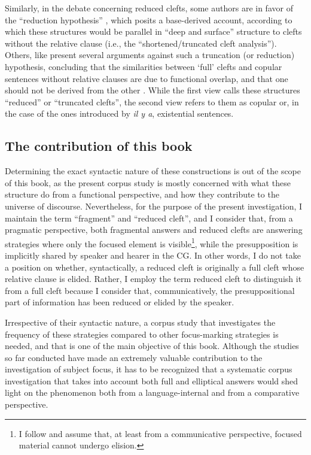 Similarly, in the debate concerning reduced clefts, some authors are in favor of the “reduction hypothesis” \parencite{jenkins2017cleft}, which posits a base-derived account, according to which these structures would be parallel in “deep and surface” structure to clefts without the relative clause (i.e., the ``shortened/truncated cleft analysis”). Others, like \textcite{milsark2014existential, birner2007functional} present several arguments against such a truncation (or reduction) hypothesis, concluding that the similarities between ‘full’ clefts and copular sentences without relative clauses are due to functional overlap, and that one should not be derived from the other \parencite[319]{birner2007functional}. While the first view calls these structures ``reduced” or ``truncated clefts”, the second view refers to them as copular or, in the case of the ones introduced by \textit{il y a}, existential sentences.

\subsection{The contribution of this book}
Determining the exact syntactic nature of these constructions is out of the scope of this book, as the present corpus study is mostly concerned with what these structure do from a functional perspective, and how they contribute to the universe of discourse. Nevertheless, for the purpose of the present investigation, I maintain the term ``fragment” and ``reduced cleft”, and I consider that, from a pragmatic perspective, both fragmental answers and reduced clefts are answering strategies where only the focused element is visible\footnote{I follow \textcite{yoshida2013predictive} and assume that, at least from a communicative perspective, focused material cannot undergo elision.
}, while the presupposition is implicitly shared by speaker and hearer in the CG. In other words, I do not take a position on whether, syntactically, a reduced cleft is originally a full cleft whose relative clause is elided. Rather, I employ the term reduced cleft to distinguish it from a full cleft because I consider that, communicatively, the presuppositional part of information has been reduced or elided by the speaker.

Irrespective of their syntactic nature, a corpus study that investigates the frequency of these strategies compared to other focus-marking strategies is needed, and that is one of the main objective of this book.
Although the studies so far conducted have made an extremely valuable contribution  to the investigation of subject focus, it has to be recognized that a systematic corpus investigation that takes into account both full and elliptical answers would shed light on the phenomenon both from a language-internal and from a comparative perspective. 

